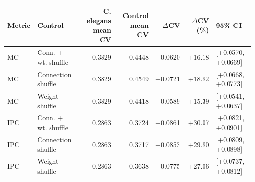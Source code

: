 \begin{tabular}{llrrrrl}
\toprule
Metric & Control & C. elegans mean CV & Control mean CV & $\Delta$CV & $\Delta$CV (\%) & 95\% CI \\
\midrule
MC & Conn. + wt. shuffle & 0.3829 & 0.4448 & +0.0620 & +16.18 & [+0.0570, +0.0669] \\
MC & Connection shuffle & 0.3829 & 0.4549 & +0.0721 & +18.82 & [+0.0668, +0.0773] \\
MC & Weight shuffle & 0.3829 & 0.4418 & +0.0589 & +15.39 & [+0.0541, +0.0637] \\
IPC & Conn. + wt. shuffle & 0.2863 & 0.3724 & +0.0861 & +30.07 & [+0.0821, +0.0901] \\
IPC & Connection shuffle & 0.2863 & 0.3717 & +0.0853 & +29.80 & [+0.0809, +0.0898] \\
IPC & Weight shuffle & 0.2863 & 0.3638 & +0.0775 & +27.06 & [+0.0737, +0.0812] \\
\bottomrule
\end{tabular}
